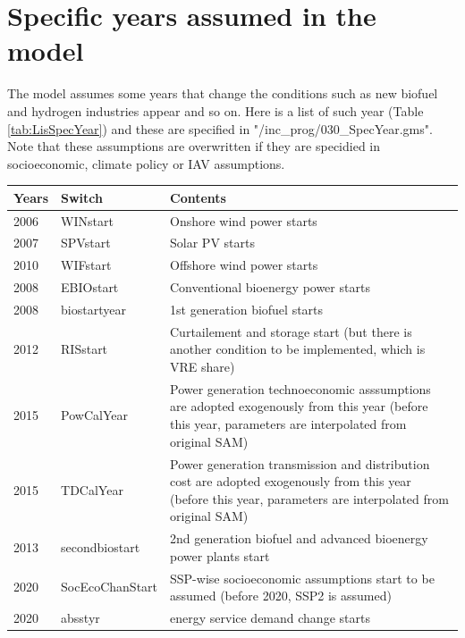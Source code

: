 \documentclass[10pt,a4paper,titlepage,dvipdfmx]{book}
\begin{document}
\section{\label{sec:SpecYearAssum}Specific years assumed in the model}

The model assumes some years that change the conditions such as new biofuel and hydrogen industries appear and so on.
Here is a list of such year (Table \ref{tab:LisSpecYear}) and these are specified in "/inc\_prog/030\_SpecYear.gms".
Note that these assumptions are overwritten if they are specidied in socioeconomic, climate policy or IAV assumptions.

\begin{tabularx}{\textwidth}{|
p{}|
p{}|
p{}|} 
\caption{\label{tab:LisSpecYear} List of specific assumptions years} \\
\hline 
Years & Switch & Contents \\\hline 
2006 & WINstart & Onshore wind power starts \\\hline 
2007 & SPVstart & Solar PV starts \\\hline 
2010 & WIFstart & Offshore wind power starts \\\hline 
2008 & EBIOstart & Conventional bioenergy power starts \\\hline 
2008 & biostartyear & 1st generation biofuel starts \\\hline 
2012 & RISstart & Curtailement and storage start (but there is another condition to be implemented, which is VRE share) \\\hline 
2015 & PowCalYear & Power generation technoeconomic asssumptions are adopted exogenously from this year (before this year, parameters are interpolated from original SAM) \\\hline
2015 & TDCalYear & Power generation transmission and distribution cost are adopted exogenously from this year (before this year, parameters are interpolated from original SAM)  \\\hline 
2013 & secondbiostart & 2nd generation biofuel and advanced bioenergy power plants start \\\hline 
2020 & SocEcoChanStart & SSP-wise socioeconomic assumptions start to be assumed (before 2020, SSP2 is assumed) \\\hline 
2020 & absstyr & energy service demand change starts \\\hline 

\end{tabularx}
\end{document}
